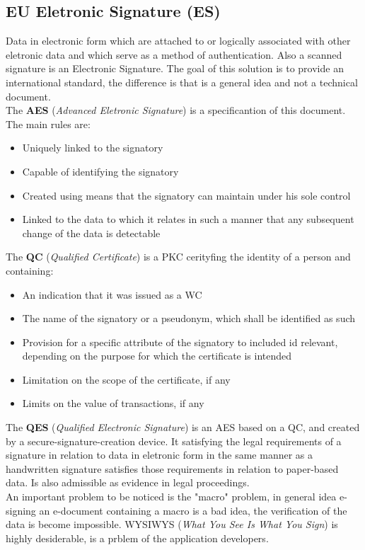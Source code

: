 \documentclass[12pt]{article}
\begin{document}
\subsection{EU Eletronic Signature (ES)}
Data in electronic form which are attached to or logically associated with other eletronic data and which serve as a method of authentication. Also a scanned signature is an Electronic Signature. The goal of this solution is to provide an international standard, the difference is that is a general idea and not a technical document.\\
The \textbf{AES} (\textit{Advanced Eletronic Signature}) is a specificantion of this document. The main rules are:
\begin{itemize}
  \item Uniquely linked to the signatory
  \item Capable of identifying the signatory
  \item Created using means that the signatory can maintain under his sole control
  \item Linked to the data to which it relates in such a manner that any subsequent change of the data is detectable
\end{itemize}
The \textbf{QC} (\textit{Qualified Certificate}) is a PKC cerityfing the identity of a person and containing:
\begin{itemize}
  \item An indication that it was issued as a WC
  \item The name of the signatory or a pseudonym, which shall be identified as such
  \item Provision for a specific attribute of the signatory to included id relevant, depending on the purpose for which the certificate is intended
  \item Limitation on the scope of the certificate, if any
  \item Limits on the value of transactions, if any
\end{itemize}
The \textbf{QES} (\textit{Qualified Electronic Signature}) is an AES based on a QC, and created by a secure-signature-creation device. It satisfying the legal requirements of a signature in relation to data in eletronic form in the same manner as a handwritten signature satisfies those requirements in relation to paper-based data. Is also admissible as evidence in legal proceedings.\\
An important problem to be noticed is the "macro" problem, in general idea e-signing an e-document containing a macro is a bad idea, the verification of the data is become impossible. WYSIWYS (\textit{What You See Is What You Sign}) is highly desiderable, is a prblem of the application developers.
\end{document}
